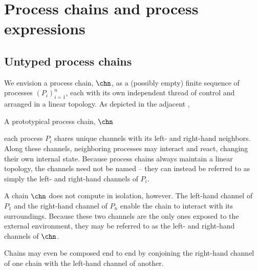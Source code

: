 \section{Process chains and process expressions}\label{sec:process-chains:interpretation}

\subsection{Untyped process chains}\label{sec:process-chains:untyped-chains}

We envision a process chain, $\chn$, as a (possibly empty) finite sequence of processes $(P_i)_{i=1}^{n}$, each with its own independent thread of control and arranged in a linear topology.
As depicted in the adjacent ,%
%
\begin{marginfigure}
  \centering
  \caption{A prototypical process chain, $\chn$}\label{fig:singleton-processes:chain-topology}
\end{marginfigure}
%
each process $P_i$ shares unique channels with its left- and right-hand neighbors.
Along these channels, neighboring processes may interact and react, changing their own internal state.
Because process chains always maintain a linear topology, the channels need not be named -- they can instead be referred to as simply the left- and right-hand channels of $P_i$.

A chain $\chn$ does not compute in isolation, however.
The left-hand channel of $P_1$ and the right-hand channel of $P_n$ enable the chain to interact with its surroundings.
Because these two channels are the only ones exposed to the external environment, they may be referred to as the left- and right-hand channels of $\chn$.

Chains may even be composed end to end by conjoining the right-hand channel of one chain with the left-hand channel of another.

